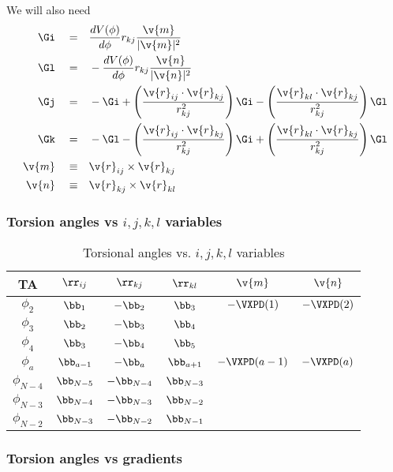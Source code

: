 We will also need \cite{Bekker95}
\begin{align}
  \label{Bekker-Gi}\Gi\quad=&\quad \frac{dV(\phi)}{d\phi}r_{kj}\frac{\v{m}}{|\v{m}|^2}\\
  \label{Bekker-Gl}\Gl\quad=&\quad-\frac{dV(\phi)}{d\phi}r_{kj}\frac{\v{n}}{|\v{n}|^2}\\
\Gj\quad=&\quad-\Gi +\left(\frac{\v{r}_{ij}\cdot{\v{r}_{kj}}}{r_{kj}^2}\right)\Gi
  -\left(\frac{\v{r}_{kl}\cdot{\v{r}_{kj}}}{r_{kj}^2}\right)\Gl\\
  \label{Bekker-Gk}\Gk\quad=&\quad-\Gl
  -\left(\frac{\v{r}_{ij}\cdot{\v{r}_{kj}}}{r_{kj}^2}\right)\Gi
  +\left(\frac{\v{r}_{kl}\cdot{\v{r}_{kj}}}{r_{kj}^2}\right)\Gl\\
\v{m}\quad\equiv&\quad\v{r}_{ij}\times\v{r}_{kj}\\
\v{n}\quad\equiv&\quad\v{r}_{kj}\times\v{r}_{kl}
\end{align}

\clearpage
\subsubsection{Torsion angles vs $i, j, k, l$ variables }

\begin{table}
  \centering
  \caption{Torsional angles vs. $i, j, k, l$ variables}
  \begin{tabular}{|*{6}{c|}}
\hline
TA 		& $\rr_{ij}$ 	& $\rr_{kj}$ 	& $\rr_{kl}$	& $\v{m}$	& $\v{n}$	  	\\
\hline
$\phi_2$	& $\bb_1$	& $-\bb_2$ 	& $\bb_3$	& $-\VXPD(1)$ 	& $-\VXPD(2)$ 		\\
$\phi_3$	& $\bb_2$	& $-\bb_3$	& $\bb_4$		\\
$\phi_4$	& $\bb_3$	& $-\bb_4$	& $\bb_5$		\\
$\phi_a$	& $\bb_{a-1}$	& $-\bb_a$	& $\bb_{a+1}$	& $-\VXPD(a-1)$ & $-\VXPD(a)$ 		\\
$\phi_{N-4}$	& $\bb_{N-5}$	& $-\bb_{N-4}$	& $\bb_{N-3}$		\\
$\phi_{N-3}$	& $\bb_{N-4}$	& $-\bb_{N-3}$	& $\bb_{N-2}$		\\
$\phi_{N-2}$	& $\bb_{N-3}$	& $-\bb_{N-2}$	& $\bb_{N-1}$		\\
\hline
  \end{tabular}
\end{table}

\clearpage
\subsubsection{Torsion angles vs gradients }

